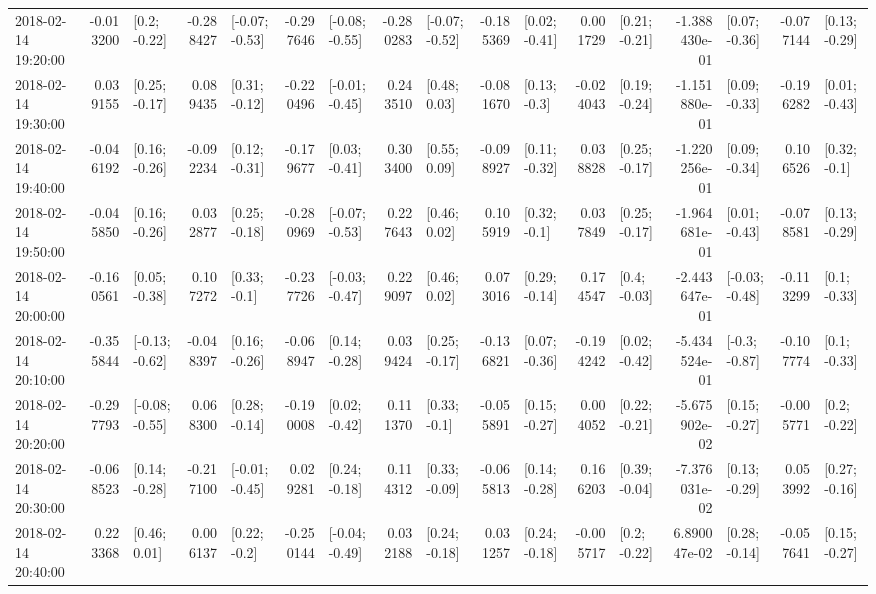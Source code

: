 \begin{tabular}{lrlrlrlrlrlrlrlrl}
2018-02-14 19:20:00 & -0.013200 &    [0.2; -0.22] & -0.288427 &  [-0.07; -0.53] & -0.297646 &  [-0.08; -0.55] & -0.280283 &  [-0.07; -0.52] & -0.185369 &   [0.02; -0.41] &  0.001729 &   [0.21; -0.21] & -1.388430e-01 &   [0.07; -0.36] & -0.077144 &   [0.13; -0.29] \\
2018-02-14 19:30:00 &  0.039155 &   [0.25; -0.17] &  0.089435 &   [0.31; -0.12] & -0.220496 &  [-0.01; -0.45] &  0.243510 &    [0.48; 0.03] & -0.081670 &    [0.13; -0.3] & -0.024043 &   [0.19; -0.24] & -1.151880e-01 &   [0.09; -0.33] & -0.196282 &   [0.01; -0.43] \\
2018-02-14 19:40:00 & -0.046192 &   [0.16; -0.26] & -0.092234 &   [0.12; -0.31] & -0.179677 &   [0.03; -0.41] &  0.303400 &    [0.55; 0.09] & -0.098927 &   [0.11; -0.32] &  0.038828 &   [0.25; -0.17] & -1.220256e-01 &   [0.09; -0.34] &  0.106526 &    [0.32; -0.1] \\
2018-02-14 19:50:00 & -0.045850 &   [0.16; -0.26] &  0.032877 &   [0.25; -0.18] & -0.280969 &  [-0.07; -0.53] &  0.227643 &    [0.46; 0.02] &  0.105919 &    [0.32; -0.1] &  0.037849 &   [0.25; -0.17] & -1.964681e-01 &   [0.01; -0.43] & -0.078581 &   [0.13; -0.29] \\
2018-02-14 20:00:00 & -0.160561 &   [0.05; -0.38] &  0.107272 &    [0.33; -0.1] & -0.237726 &  [-0.03; -0.47] &  0.229097 &    [0.46; 0.02] &  0.073016 &   [0.29; -0.14] &  0.174547 &    [0.4; -0.03] & -2.443647e-01 &  [-0.03; -0.48] & -0.113299 &    [0.1; -0.33] \\
2018-02-14 20:10:00 & -0.355844 &  [-0.13; -0.62] & -0.048397 &   [0.16; -0.26] & -0.068947 &   [0.14; -0.28] &  0.039424 &   [0.25; -0.17] & -0.136821 &   [0.07; -0.36] & -0.194242 &   [0.02; -0.42] & -5.434524e-01 &   [-0.3; -0.87] & -0.107774 &    [0.1; -0.33] \\
2018-02-14 20:20:00 & -0.297793 &  [-0.08; -0.55] &  0.068300 &   [0.28; -0.14] & -0.190008 &   [0.02; -0.42] &  0.111370 &    [0.33; -0.1] & -0.055891 &   [0.15; -0.27] &  0.004052 &   [0.22; -0.21] & -5.675902e-02 &   [0.15; -0.27] & -0.005771 &    [0.2; -0.22] \\
2018-02-14 20:30:00 & -0.068523 &   [0.14; -0.28] & -0.217100 &  [-0.01; -0.45] &  0.029281 &   [0.24; -0.18] &  0.114312 &   [0.33; -0.09] & -0.065813 &   [0.14; -0.28] &  0.166203 &   [0.39; -0.04] & -7.376031e-02 &   [0.13; -0.29] &  0.053992 &   [0.27; -0.16] \\
2018-02-14 20:40:00 &  0.223368 &    [0.46; 0.01] &  0.006137 &    [0.22; -0.2] & -0.250144 &  [-0.04; -0.49] &  0.032188 &   [0.24; -0.18] &  0.031257 &   [0.24; -0.18] & -0.005717 &    [0.2; -0.22] &  6.890047e-02 &   [0.28; -0.14] & -0.057641 &   [0.15; -0.27] \\

\end{tabular}
